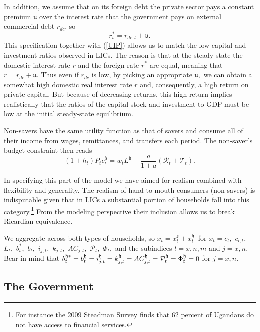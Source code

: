 \documentclass[11pt]{article}
\begin{document}
In addition, we assume that on its foreign debt the private sector pays a
constant premium $\mathfrak{u}$ over the interest rate that the government
pays on external commercial debt $r_{dc}$, so 
\begin{equation*}
r_{t}^{\ast }=r_{dc,t}+\mathfrak{u.}
\end{equation*}%
This specification together with (\ref{UIP}) allows us to match the low
capital and investment ratios observed in LICs. The reason is that at the
steady state the domestic interest rate $r$ and the foreign rate $r^{\ast }$
are equal, meaning that $\bar{r}=\bar{r}_{dc}+\mathfrak{u.}$ Thus even if $%
\bar{r}_{dc}$ is low, by picking an appropriate $\mathfrak{u,}$ we can
obtain a somewhat high domestic real interest rate $\bar{r}$ and,
consequently, a high return on private capital. But because of decreasing
returns, this high return implies realistically that the ratios of the
capital stock and investment to GDP must be low at the initial steady-state
equilibrium.

Non-savers have the same utility function as that of savers and consume all
of their income from wages, remittances, and transfers each period. The
non-saver's budget constraint then reads 
\begin{equation}
(1+h_{t})P_{t}c_{t}^{\mathfrak{h}}=w_{t}L^{\mathfrak{h}}+\frac{a}{1+a}(%
\mathcal{R}_{t}+\mathcal{T}_{t})\text{.}  \label{hm_BC}
\end{equation}

In specifying this part of the model we have aimed for realism combined with
flexibility and generality. The realism of hand-to-mouth consumers
(non-savers) is indisputable given that in LICs a substantial portion of
households fall into this category.\footnote{%
For instance the 2009 Steadman Survey finds that 62 percent of Ugandans do
not have access to financial services.} From the modeling perspective their
inclusion allows us to break Ricardian equivalence.

We aggregate across both types of households, so $x_{t}=x_{t}^{\mathfrak{s}%
}+x_{t}^{\mathfrak{h}}$\ for $x_{t}=c_{t},$ $c_{l,t},$ $L_{t},$ $b_{t}^{\ast
},$ $b_{t},$ $i_{j,t},$ $k_{j,t},$ $AC_{j,t},$ $\mathcal{P}_{t},$ $\Phi
_{t}, $ and the subindices $l=x,n,m$ and $j=x,n.$ Bear in mind that $b_{t}^{%
\mathfrak{h}\ast }=b_{t}^{\mathfrak{h}}=i_{j,t}^{\mathfrak{h}}=k_{j,t}^{%
\mathfrak{h}}=AC_{j,t}^{\mathfrak{h}}=\mathcal{P}_{t}^{\mathfrak{h}}=\Phi
_{t}^{\mathfrak{h}}=0$ for $j=x,n$.

\subsection{The Government}
\end{document}

